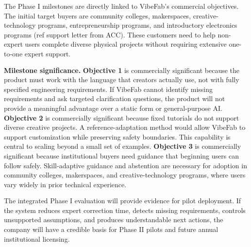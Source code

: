 

The Phase I milestones are directly linked to VibeFab's commercial objectives. The initial target buyers are community colleges, makerspaces, creative-technology programs, entrepreneurship programs, and introductory electronics programs (ref support letter from ACC). These customers need to help non-expert users complete diverse physical projects without requiring extensive one-to-one expert support.

\textbf{Milestone significance.} 
\textbf{Objective 1} is commercially significant because the product must work with the language that creators actually use, not with fully specified engineering requirements. If VibeFab cannot identify missing requirements and ask targeted clarification questions, the product will not provide a meaningful advantage over a static form or general-purpose AI.
\textbf{Objective 2} is commercially significant because fixed tutorials do not support diverse creative projects. A reference-adaptation method would allow VibeFab to support customization while preserving safety boundaries. This capability is central to scaling beyond a small set of examples.
\textbf{Objective 3} is commercially significant because institutional buyers need guidance that beginning users can follow safely. Skill-adaptive guidance and abstention are necessary for adoption in community colleges, makerspaces, and creative-technology programs, where users vary widely in prior technical experience.

The integrated Phase I evaluation will provide evidence for pilot deployment. If the system reduces expert correction time, detects missing requirements, controls unsupported assumptions, and produces understandable next actions, the company will have a credible basis for Phase II pilots and future annual institutional licensing.


